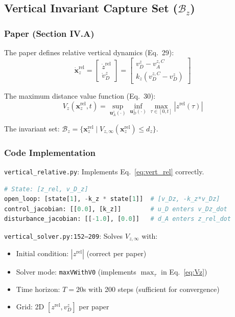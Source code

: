 \documentclass[11pt,a4paper]{article}
\begin{document}
\subsection{Vertical Invariant Capture Set ($\mathcal{B}_z$)}

\subsubsection{Paper (Section IV.A)}

The paper defines relative vertical dynamics (Eq.~29):
\begin{equation}
\dot{\mathbf{x}}^{\mathrm{rel}}_z = \begin{bmatrix} \dot{z}^{\mathrm{rel}} \\ \dot{v}^z_D \end{bmatrix} = \begin{bmatrix} v^z_D - v^{z,C}_A \\ k_z(v^{z,C}_D - v^z_D) \end{bmatrix}
\label{eq:vert_rel}
\end{equation}

The maximum distance value function (Eq.~30):
\begin{equation}
V_z(\mathbf{x}^{\mathrm{rel}}_z, t) = \sup_{\mathbf{u}^z_A(\cdot)} \inf_{\mathbf{u}^z_D(\cdot)} \max_{\tau \in [0,t]} |z^{\mathrm{rel}}(\tau)|
\label{eq:Vz}
\end{equation}

The invariant set: $\mathcal{B}_z = \{\mathbf{x}^{\mathrm{rel}}_z \mid V_{z,\infty}(\mathbf{x}^{\mathrm{rel}}_z) \leq d_z\}$.

\subsubsection{Code Implementation}

\texttt{vertical\_relative.py}: Implements Eq.~\eqref{eq:vert_rel} correctly.
\begin{lstlisting}[language=Python]
# State: [z_rel, v_D_z]
open_loop: [state[1], -k_z * state[1]]  # [v_Dz, -k_z*v_Dz]
control_jacobian: [[0.0], [k_z]]        # u_D enters v_Dz_dot
disturbance_jacobian: [[-1.0], [0.0]]   # d_A enters z_rel_dot
\end{lstlisting}

\texttt{vertical\_solver.py:152--209}: Solves $V_{z,\infty}$ with:
\begin{itemize}[nosep]
\item Initial condition: $|z^{\mathrm{rel}}|$ (correct per paper)
\item Solver mode: \texttt{maxVWithV0} (implements $\max_\tau$ in Eq.~\eqref{eq:Vz})
\item Time horizon: $T=20$s with 200 steps (sufficient for convergence)
\item Grid: 2D $[z^{\mathrm{rel}}, v^z_D]$ per paper
\end{itemize}
\end{document}
